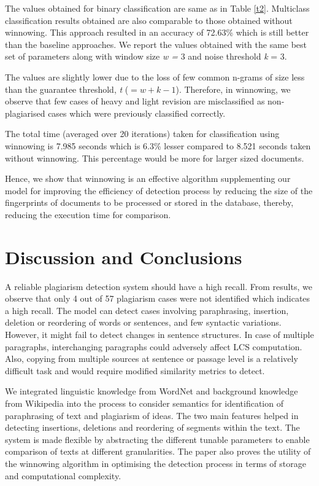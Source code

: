 \documentclass[11pt]{article}
\begin{document}
The values obtained for binary classification are same as in Table \ref{t2}. Multiclass classification results obtained are also comparable to those obtained without winnowing. This approach resulted in an accuracy of 72.63\% which is still better than the baseline approaches. We report the values obtained with the same best set of parameters along with window size {\em  w =} 3 and noise threshold {\em  k} = 3.
	
  The values are slightly lower due to the loss of few common n-grams of size less than the guarantee threshold, {\em  t} ($= w + k - 1$). Therefore, in winnowing, we observe that few cases of heavy and light revision are misclassified as non-plagiarised cases which were previously classified correctly.

The total time (averaged over 20 iterations) taken for classification using winnowing is 7.985 seconds which is 6.3\% lesser compared to 8.521 seconds taken without winnowing. This percentage would be more for larger sized documents.

Hence, we show that winnowing is an effective algorithm supplementing our model for improving the efficiency of detection process by reducing the size of the fingerprints of documents to be processed or stored in the database, thereby, reducing the execution time for comparison. 

\section{Discussion and Conclusions}\label{5}
A reliable plagiarism detection system should have a high recall. From results, we observe that only 4 out of 57 plagiarism cases were not identified which indicates a high recall. The model can detect cases involving paraphrasing, insertion, deletion or reordering of words or sentences, and few syntactic variations. However, it might fail to detect changes in sentence structures. In case of multiple paragraphs, interchanging paragraphs could adversely affect LCS computation. Also, copying from multiple sources at sentence or passage level is a relatively difficult task and would require modified similarity metrics to detect.

 We integrated linguistic knowledge from WordNet and background knowledge from Wikipedia into the process to consider semantics for identification of paraphrasing of text and plagiarism of ideas. The two main features helped in detecting insertions, deletions and reordering of segments within the text. The system is made flexible by abstracting the different tunable parameters to enable comparison of texts at different granularities. The paper also proves the utility of the winnowing algorithm in optimising the detection process in terms of storage and computational complexity.
\end{document}
